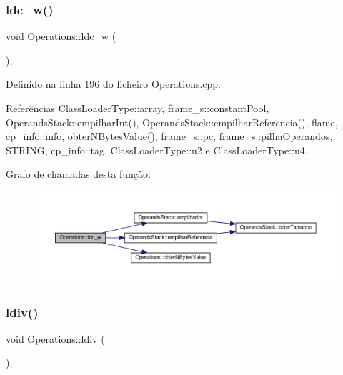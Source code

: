 \subsubsection{\texorpdfstring{ldc\+\_\+w()}{ldc\_w()}}
{\footnotesize\ttfamily void Operations\+::ldc\+\_\+w (\begin{DoxyParamCaption}{ }\end{DoxyParamCaption})\hspace{0.3cm}{\ttfamily [static]}, {\ttfamily [private]}}



Definido na linha 196 do ficheiro Operations.\+cpp.



Referências Class\+Loader\+Type\+::array, frame\+\_\+s\+::constant\+Pool, Operands\+Stack\+::empilhar\+Int(), Operands\+Stack\+::empilhar\+Referencia(), flame, cp\+\_\+info\+::info, obter\+N\+Bytes\+Value(), frame\+\_\+s\+::pc, frame\+\_\+s\+::pilha\+Operandos, S\+T\+R\+I\+NG, cp\+\_\+info\+::tag, Class\+Loader\+Type\+::u2 e Class\+Loader\+Type\+::u4.

Grafo de chamadas desta função\+:
\nopagebreak
\begin{figure}[H]
\begin{center}
\leavevmode
\includegraphics[width=350pt]{classOperations_a081fd22827f77e8ce5219275256cc831_cgraph}
\end{center}
\end{figure}
\mbox{\label{classOperations_ab9bb90a9db0433e1d04b0eb9bceea9f4}} 
\subsubsection{\texorpdfstring{ldiv()}{ldiv()}}
{\footnotesize\ttfamily void Operations\+::ldiv (\begin{DoxyParamCaption}{ }\end{DoxyParamCaption})\hspace{0.3cm}{\ttfamily [static]}, {\ttfamily [private]}}



